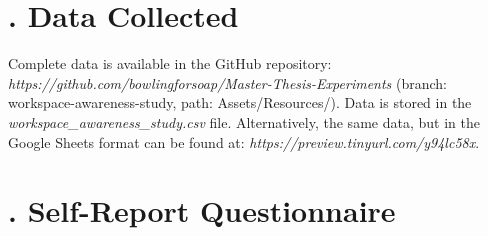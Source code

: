 \begin{appendices}
\begin{figure}
	\hfill
	\par\smallskip
	\hfill
\end{figure}

\chapter{. Data Collected}
\label{app:final_study_data_collected}
Complete data is available in the GitHub repository: \textit{https://github.com/bowlingforsoap/Master-Thesis-Experiments} (branch: workspace-awareness-study, path: Assets/Resources/). Data is stored in the \textit{workspace\_awareness\_study.csv} file. Alternatively, the same data, but in the Google Sheets format can be found at: \textit{https://preview.tinyurl.com/y94lc58x}.

\chapter{. Self-Report Questionnaire}


\end{appendices}